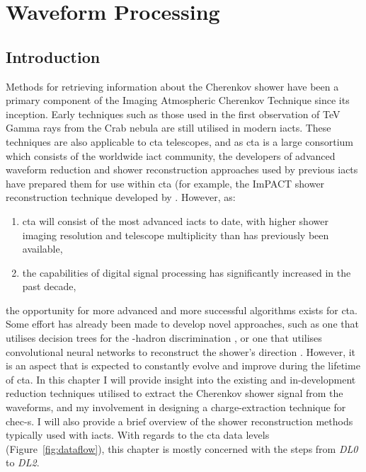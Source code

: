 \chapter{\label{ch6-reduction}Waveform Processing} 

\minitoc

\section{Introduction}

Methods for retrieving information about the Cherenkov shower have been a primary component of the Imaging Atmospheric Cherenkov Technique since its inception. Early techniques such as those used in the first observation of TeV Gamma rays from the Crab nebula \cite{Weekes1989} are still utilised in modern \glspl{iact}. These techniques are also applicable to \gls{cta} telescopes, and as \gls{cta} is a large consortium which consists of the worldwide \gls{iact} community, the developers of advanced waveform reduction and shower reconstruction approaches used by previous \glspl{iact} have prepared them for use within \gls{cta} (for example, the ImPACT shower reconstruction technique developed by \cite{Parsons2014}. However, as:
\begin{enumerate}[label=(\alph*)]
	\item \gls{cta} will consist of the most advanced \glspl{iact} to date, with higher shower imaging resolution and telescope multiplicity than has previously been available,
	\item the capabilities of digital signal processing has significantly increased in the past decade,
\end{enumerate}
the opportunity for more advanced and more successful algorithms exists for \gls{cta}. Some effort has already been made to develop novel approaches, such as one that utilises decision trees for the \textgamma-hadron discrimination \cite{Ohm2009}, or one that utilises convolutional neural networks to reconstruct the shower's direction \cite{Shilon2018}. However, it is an aspect that is expected to constantly evolve and improve during the lifetime of \gls{cta}. In this chapter I will provide insight into the existing and in-development reduction techniques utilised to extract the Cherenkov shower signal from the waveforms, and my involvement in designing a charge-extraction technique for \gls{chec-s}. I will also provide a brief overview of the shower reconstruction methods typically used with \glspl{iact}. With regards to the \gls{cta} data levels (Figure~\ref{fig:dataflow}), this chapter is mostly concerned with the steps from \textit{DL0} to \textit{DL2}.

